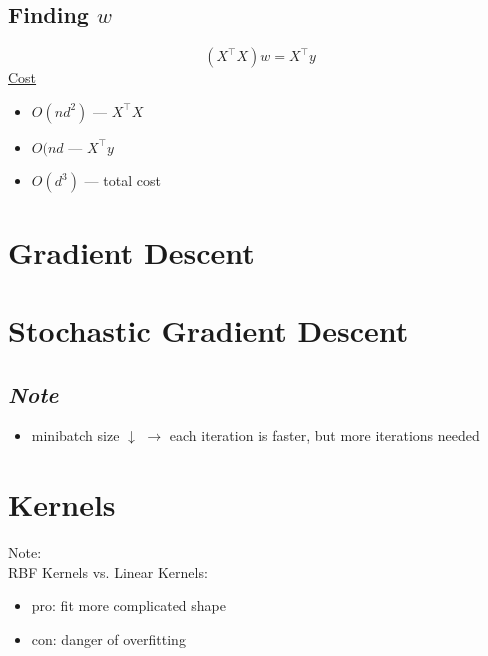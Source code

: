\documentclass[10pt,landscape,a4paper]{article}
\begin{document}
\begin{multicols*}{5}
\subsection{Finding \(w\)}
\begin{dmath*}
    (X^\intercal X) w = X^\intercal y
\end{dmath*}
\underline{Cost}
\begin{itemize}
    \item \(O(nd^2)\) --- \(X^\intercal X\)
    \item \(O(nd\) --- \(X^\intercal y\)
    \item \(O(d^3)\) --- total cost
\end{itemize}

\section{Gradient Descent}

\section{Stochastic Gradient Descent}

\subsection{\emph{Note}}
\begin{itemize}
    \item minibatch size \(\downarrow \) \(\rightarrow \) each iteration is faster, but more iterations needed
\end{itemize}

\section{Kernels}

Note: \\
RBF Kernels vs. Linear Kernels:
\begin{itemize}
    \item pro: fit more complicated shape
    \item con: danger of overfitting
\end{itemize}


\end{multicols*}
\end{document}
